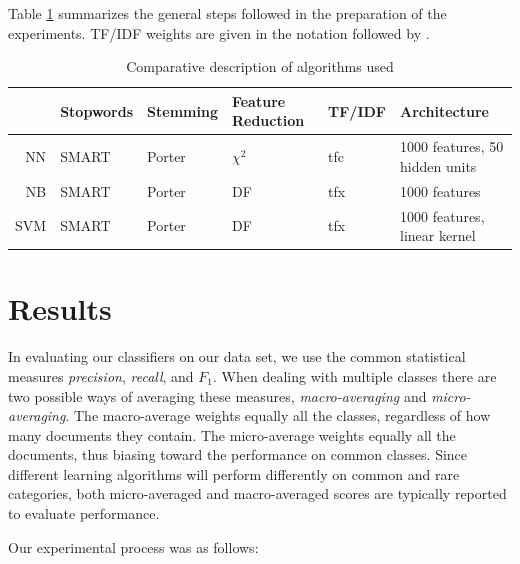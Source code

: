 \documentclass[twocolumn]{article}
\begin{document}
Table \ref{algos} summarizes the general steps followed in the
preparation of the experiments.  TF/IDF weights are given in the
notation followed by \cite{salton:88}.

\begin{table}
\begin{tabularx}{\linewidth}{|r|l|l|l|l|X|}
\hline
& Stopwords & Stemming & Feature Reduction & TF/IDF & Architecture\\
\hline
NN & SMART & Porter & $\chi^2$ & tfc & 1000 features, 50 hidden units \\
\hline
NB & SMART & Porter & DF & tfx & 1000 features \\
\hline
SVM & SMART & Porter & DF & tfx & 1000 features, linear kernel \\

\hline
\end{tabularx}
\caption{Comparative description of algorithms used}
\label{algos}
\end{table}


\section{Results}
\label{results}

In evaluating our classifiers on our data set, we use the common
statistical measures \emph{precision}, \emph{recall}, and
$F_1$. \cite{yang:99} \cite{rijsbergen:79} When dealing with multiple
classes there are two possible ways of averaging these measures,
\emph{macro-averaging} and \emph{micro-averaging}. The macro-average
weights equally all the classes, regardless of how many documents they
contain. The micro-average weights equally all the documents, thus
biasing toward the performance on common classes.  Since different
learning algorithms will perform differently on common and rare
categories, both micro-averaged and macro-averaged scores are
typically reported to evaluate performance.

Our experimental process was as follows:
\end{document}
